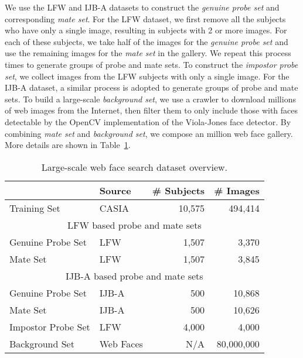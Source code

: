 \documentclass[10pt,journal,compsoc]{IEEEtran}
\begin{document}
We use the LFW and IJB-A datasets to construct the \emph{genuine probe set} and corresponding \emph{mate set}.
For the LFW dataset, we first remove all the subjects who have only a single image, resulting in  subjects with 2 or more images. For each of these subjects, we take half of the images for the \emph{genuine probe set} and use the remaining images for the \emph{mate set} in the gallery. We repeat this process  times to generate  groups of probe and mate sets. To construct the \emph{impostor probe set}, we collect  images from the LFW subjects with only a single image. For the IJB-A dataset, a similar process is adopted to generate  groups of probe and mate sets. To build a large-scale \emph{background set}, we use a crawler to download millions of web images from the Internet, then filter them to only include those with faces detectable by the OpenCV implementation of the Viola-Jones face detector. By combining \emph{mate set} and \emph{background set}, we compose an  million web face gallery. More details are shown in Table~\ref{tab:web_ret}.
\begin{table}[htbp]
\centering
\caption{Large-scale web face search dataset overview.}\label{tab:web_ret}
    \begin{tabular}{llrr}
    \toprule
                       & Source                   & \# Subjects  & \# Images  \\ \midrule
    Training Set       & CASIA~\cite{DB:CASIA}    & 10,575       & 494,414           \\ \midrule
    \multicolumn{4}{c}{LFW based probe and mate sets} \\
    Genuine Probe Set  & LFW~\cite{DB:LFWTech}    & 1,507        & 3,370             \\
    Mate Set           & LFW~\cite{DB:LFWTech}    & 1,507        & 3,845             \\ \midrule
    \multicolumn{4}{c}{IJB-A based probe and mate sets} \\
    Genuine Probe Set  & IJB-A~\cite{DB:LFWTech}  & 500          & 10,868            \\
    Mate Set           & IJB-A~\cite{DB:LFWTech}  & 500          & 10,626            \\ \midrule
    Impostor Probe Set & LFW~\cite{DB:LFWTech}    & 4,000        & 4,000             \\
    Background Set     & Web Faces                & N/A           & 80,000,000        \\
    \bottomrule
    \end{tabular}
\end{table}
\end{document}
